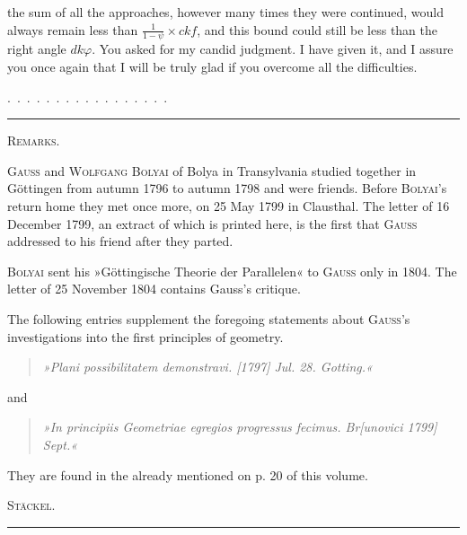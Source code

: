 the sum of all the approaches, however many times they were continued,
would always remain less than $\frac{1}{1-\psi} \times ckf$, and
this bound could still be less than the right angle
$dk\varphi$. You asked for my candid judgment. I
have given it, and I assure you once again that
I will be truly glad if you overcome all the difficulties.

.\, .\, .\, .\, .\, .\, .\, .\, .\, .\, .\, .\, .\, .\, .\, .\, .

\medskip
\begin{center}
\rule{0.3\textwidth}{0.4pt}
\end{center}
\medskip

\begin{center}
\textsc{Remarks.}
\end{center}

\textsc{Gauss} and \textsc{Wolfgang Bolyai} of Bolya in
Transylvania studied together in Göttingen from autumn 1796 to autumn 1798
and were friends. Before
\textsc{Bolyai}'s return home they met once more, on 25 May 1799 in
Clausthal. The letter of 16 December 1799, an extract of
which is printed here, is the first that \textsc{Gauss}
addressed to his friend after they parted.

\textsc{Bolyai} sent his »Göttingische Theorie der Parallelen« to \textsc{Gauss} only in 1804.
The letter of 25 November 1804 contains Gauss's critique.

The following entries supplement the foregoing statements about \textsc{Gauss}'s
investigations into the first principles of
geometry.

\begin{quote}
\emph{»Plani possibilitatem demonstravi. [1797] Jul. 28. Gotting.«}
\end{quote}
and
\begin{quote}
\emph{»In principiis Geometriae egregios progressus fecimus.
Br[unovici 1799] Sept.«}
\end{quote}
They are found in the  already mentioned
on p. 20 of this volume.

\begin{flushright}
\textsc{Stäckel.}
\end{flushright}

\medskip
\begin{center}
\rule{0.3\textwidth}{0.4pt}
\end{center}
